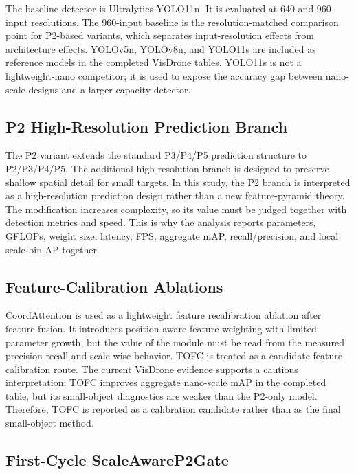 \documentclass[journal]{IEEEtran}
\begin{document}
The baseline detector is Ultralytics YOLO11n. It is evaluated at 640 and 960 input resolutions. The 960-input baseline is the resolution-matched comparison point for P2-based variants, which separates input-resolution effects from architecture effects. YOLOv5n, YOLOv8n, and YOLO11s are included as reference models in the completed VisDrone tables. YOLO11s is not a lightweight-nano competitor; it is used to expose the accuracy gap between nano-scale designs and a larger-capacity detector.

\subsection{P2 High-Resolution Prediction Branch}

The P2 variant extends the standard P3/P4/P5 prediction structure to P2/P3/P4/P5. The additional high-resolution branch is designed to preserve shallow spatial detail for small targets. In this study, the P2 branch is interpreted as a high-resolution prediction design rather than a new feature-pyramid theory. The modification increases complexity, so its value must be judged together with detection metrics and speed. This is why the analysis reports parameters, GFLOPs, weight size, latency, FPS, aggregate mAP, recall/precision, and local scale-bin AP together.

\subsection{Feature-Calibration Ablations}

CoordAttention is used as a lightweight feature recalibration ablation after feature fusion. It introduces position-aware feature weighting with limited parameter growth, but the value of the module must be read from the measured precision-recall and scale-wise behavior. TOFC is treated as a candidate feature-calibration route. The current VisDrone evidence supports a cautious interpretation: TOFC improves aggregate nano-scale mAP in the completed table, but its small-object diagnostics are weaker than the P2-only model. Therefore, TOFC is reported as a calibration candidate rather than as the final small-object method.

\subsection{First-Cycle ScaleAwareP2Gate}
\end{document}
